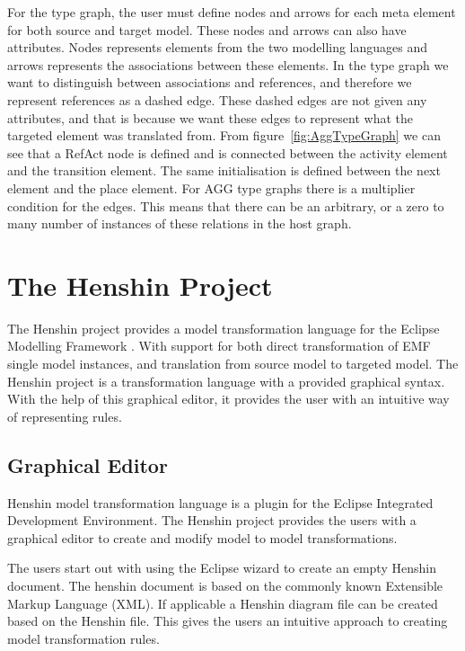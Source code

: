 \documentclass[pdftex,11pt,a4paper]{article}
\begin{document}
\indent For the type graph, the user must define nodes and arrows for each meta
element for both source and target model. These nodes and arrows can also have
attributes. Nodes represents elements from the two modelling languages and
arrows represents the associations between these elements. In the type graph we
want to distinguish between associations and references, and therefore we
represent references as a dashed edge. These dashed edges are not given any
attributes, and that is because we want these edges to represent what the
targeted element was translated from. From figure~\ref{fig:AggTypeGraph} we can
see that a RefAct node is defined and is connected between the activity
element and the transition element. The same initialisation is defined between
the next element and the place element. For AGG type graphs there is a
multiplier condition for the edges. This means that there can be an arbitrary,
or a zero to many number of instances of these relations in the host graph.

\section{The Henshin Project}

\noindent The Henshin project\cite{Henshin} provides a model transformation
language for the Eclipse Modelling Framework \cite{Steinberg2009}. With support
for both direct transformation of EMF single model instances, and translation
from source model to targeted model. The Henshin project is a transformation
language with a provided graphical syntax. With the help of this graphical
editor, it provides the user with an intuitive way of representing rules. 

\subsection{Graphical Editor}
\noindent Henshin model transformation language is a plugin for the Eclipse
Integrated Development Environment\cite{Eclipse}. The Henshin project provides
the users with a graphical editor to create and modify model to model
transformations. 

The users start out with using the Eclipse wizard to create an empty Henshin
document. The henshin document is based on the commonly known Extensible Markup
Language (XML)\cite{XML}. If applicable a Henshin diagram file can be created
based on the Henshin file. This gives the users an intuitive approach to
creating model transformation rules.
\end{document}
